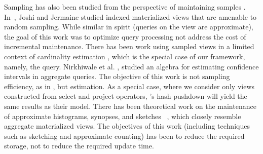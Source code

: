 Sampling has also been studied from the perspective of maintaining samples \cite{DBLP:conf/icde/OlkenR92}.
In~\cite{joshi2008materialized}, Joshi and Jermaine studied indexed materialized views that are amenable to random sampling.
While similar in spirit (queries on the view are approximate), the goal of this work was to optimize query processing not address the cost of incremental maintenance.
There has been work using sampled views in a limited context of cardinality estimation \cite{larson2007cardinality}, which is the special case of our framework, namely, the \countfunc query.
Nirkhiwale et al. \cite{DBLP:journals/pvldb/NirkhiwaleDJ13}, studied an algebra for estimating confidence intervals in aggregate queries.
The objective of this work is not sampling efficiency, as in \svc, but estimation.
As a special case, where we consider only views constructed from select and project operators, \svc's hash pushdown will yield the same results as their model.
There has been theoretical work on the maintenance of approximate histograms, synopses, and sketches ~\cite{gibbons1997fast, DBLP:journals/ftdb/CormodeGHJ12}, which closely resemble aggregate materialized views.
The objectives of this work (including techniques such as sketching and approximate counting) has been to reduce the required storage, not to reduce the required update time.

